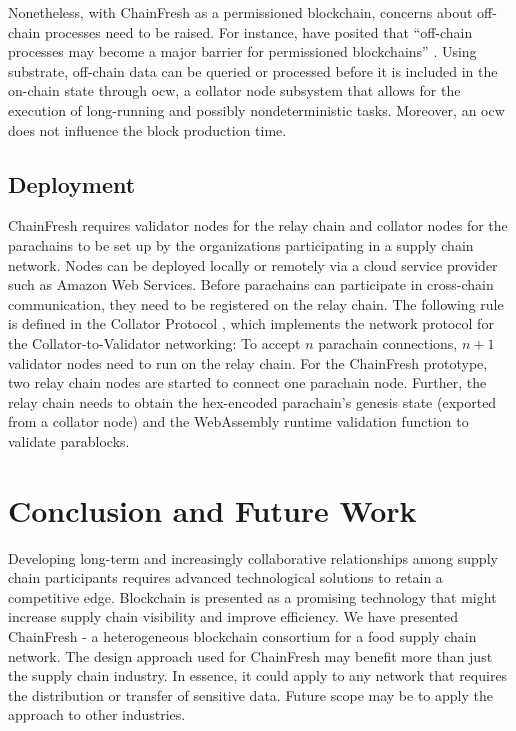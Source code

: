 \documentclass[conference]{IEEEtran}
\begin{document}
Nonetheless, with ChainFresh as a permissioned blockchain, concerns about off-chain processes need to be raised. For instance, \citeauthor{HELLIAR2020102136} have posited that ``off-chain processes may become a major barrier for permissioned blockchains'' \cite{HELLIAR2020102136}. Using substrate, off-chain data can be queried or processed before it is included in the on-chain state through \ac{ocw}, a collator node subsystem that allows for the execution of long-running and possibly nondeterministic tasks. Moreover, an \ac{ocw} does not influence the block production time.

\subsection{Deployment} \label{s:deployment}
ChainFresh requires validator nodes for  the relay chain and collator nodes for the parachains to be set up by the organizations participating in a supply chain network. Nodes can be deployed locally or remotely via a cloud service provider such as Amazon Web Services. 
Before parachains can participate in cross-chain communication, they need to be registered on the relay chain. The following rule is defined in the Collator Protocol \cite{collatorProtocol}, which implements the network protocol for the Collator-to-Validator networking: To accept $n$ parachain connections, $n + 1$ validator nodes need to run on the relay chain. For the ChainFresh prototype, two relay chain nodes are started to connect one parachain node. Further, the relay chain needs to obtain the hex-encoded parachain's genesis state (exported from a collator node) and the WebAssembly runtime validation function to validate parablocks.

\section{Conclusion and Future Work} \label{s:conclusion}
Developing long-term and increasingly collaborative relationships among supply chain participants requires advanced technological solutions to retain a competitive edge. Blockchain is presented as a promising technology that might increase supply chain visibility and improve efficiency.  We have presented ChainFresh - a heterogeneous blockchain consortium for a food supply chain network. The design approach used for ChainFresh may benefit more than just the supply chain industry. In essence, it could apply to any network that requires the distribution or transfer of sensitive data. Future scope may be to apply the approach to other industries. 

\renewcommand*{\UrlFont}{\rmfamily}
\printbibliography
\vspace{12pt}
\end{document}
